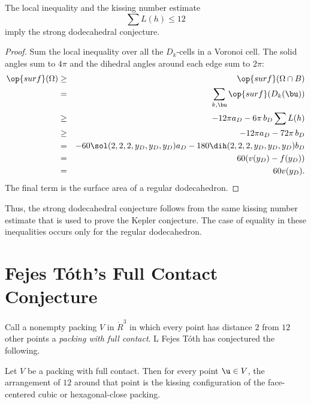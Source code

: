 \begin{lemma}[]
  The local inequality and the kissing number estimate 
\[
\sum L(h) \le 12
\]
imply the strong dodecahedral conjecture.
\end{lemma}

\begin{proof} 
  Sum the local inequality over all the $D_k$-cells in a Voronoi cell.
  The solid angles sum to $4\pi$ and the dihedral angles around each
  edge sum to $2\pi$:
\begin{eqnarray*}
  \op{surf}(\Omega) &\ge& \op{surf}(\Omega\cap B)\\
  &=&\sum_{k,\bu} \op{surf}(D_k(\bu))\\
  &\ge& -12\pi a_D - 6\pi\, b_D  \sum L(h)\\
  &\ge& -12\pi a_D - 72\pi\, b_D\\
  &=& -60 \sol(2,2,2,y_D,y_D,y_D) a_D - 180 \dih(2,2,2,y_D,y_D,y_D) b_D\\
  &=& 60 (v(y_D) - f(y_D))\\
  &=& 60 v(y_D).\\
\end{eqnarray*}
The final term is the surface area of a regular dodecahedron.
\end{proof}

Thus, the strong dodecahedral conjecture follows from the same kissing
number estimate that is used to prove the Kepler conjecture.  The case
of equality in these inequalities occurs only for the regular
dodecahedron.

\newpage
\section{Fejes T\'oth's Full Contact Conjecture}



Call a nonempty packing $ V$ in $\ring{R}^3$ in which every point has
distance $2$ from $12$ other points a {\it packing with full
  contact}. L Fejes T\'oth has conjectured the following.
%
%
%


\begin{theorem}\label{thm:fc} 
  Let $ V$ be a packing with full contact.  Then for every point $
  \u\in V$, the arrangement of $12$ around that point is the kissing
  configuration of the face-centered cubic or hexagonal-close packing.
\end{theorem}
%
%
%

